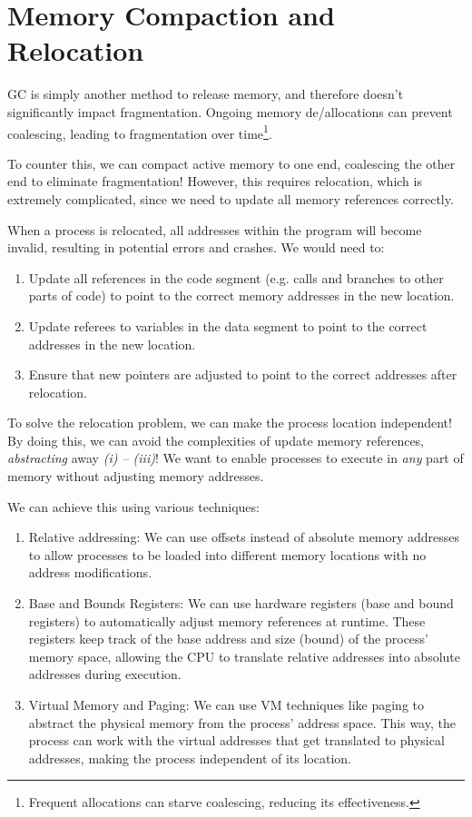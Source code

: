 \documentclass{report}
\begin{document}
\section{Memory Compaction and Relocation}
GC is simply another method to release memory, and therefore doesn't significantly impact
fragmentation. Ongoing memory de/allocations can prevent coalescing, leading to fragmentation over
time\footnote{Frequent allocations can starve coalescing, reducing its effectiveness.}. 

To counter this, we can compact active memory to one end, coalescing the other end to eliminate
fragmentation! However, this requires relocation, which is extremely complicated, since we need to
update all memory references correctly.

When a process is relocated, all addresses within the program will become invalid, resulting in
potential errors and crashes. We would need to:

\begin{enumerate}[label=\textit{(\roman*)}]
\item Update all references in the code segment (e.g. calls and branches to other parts of code) to
  point to the correct memory addresses in the new location.
\item Update referees to variables in the data segment to point to the correct addresses in the new
  location.
\item Ensure that new pointers are adjusted to point to the correct addresses after relocation.
\end{enumerate}
To solve the relocation problem, we can make the process location independent! By doing this, we can
avoid the complexities of update memory references, \textit{abstracting} away \textit{(i) -- (iii)}! We want to enable processes to execute in \textit{any} part of memory
without adjusting memory addresses. 

We can achieve this using various techniques:
\begin{enumerate}[label=\textit{(\roman*)}]
\item Relative addressing: We can use offsets instead of absolute memory addresses to allow
  processes to be loaded into different memory locations with no address modifications.
\item Base and Bounds Registers: We can use hardware registers (base and bound registers) to
  automatically adjust memory references at runtime. These registers keep track of the base address
  and size (bound) of the process' memory space, allowing the CPU to translate relative addresses
  into absolute addresses during execution.
\item Virtual Memory and Paging: We can use VM techniques like paging to abstract the physical
  memory from the process' address space. This way, the process can work with the virtual addresses
  that get translated to physical addresses, making the process independent of its location.
\end{enumerate}
\end{document}
